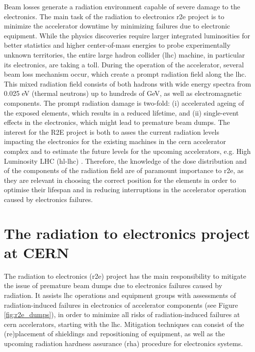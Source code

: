\documentclass[encoding=utf8,british]{tumphthesis}
\begin{document}
Beam losses generate a radiation environment capable of severe damage to the electronics. The main task of the radiation to electronics \acrshort{r2e} project is to minimize the accelerator downtime by minimizing failures due to electronic equipment. While the physics discoveries require larger integrated luminosities for better statistics and higher center-of-mass energies to probe experimentally unknown territories, the entire large hadron collider (\acrshort{lhc}) machine, in particular its electronics, are taking a toll. During the operation of the accelerator, several beam loss mechanism occur, which create a prompt radiation field along the \acrshort{lhc}. This mixed radiation field consists of both hadrons with wide energy spectra from 0.025 eV (thermal neutrons) up to hundreds of GeV, as well as  electromagnetic components. The prompt radiation damage is two-fold: (i) accelerated ageing of the exposed elements, which results in a reduced lifetime, and (ii) single-event effects in the electronics, which might lead to premature beam dumps. The interest for the R2E project is both to asses the current radiation levels impacting the electronics for the existing machines in the \acrshort{cern} accelerator complex and to estimate the future levels for the upcoming accelerators, e.g. High Luminosity LHC (\acrshort{hl-lhc}) \cite{GarcíaAlía:2310128}. Therefore, the knowledge of the dose distribution and of the components of the radiation field are of paramount importance to \acrshort{r2e}, as they are relevant in choosing the correct position for the elements in order to optimise their lifespan \cite{Kacper-Stein-paper} and in reducing interruptions in the accelerator operation caused by electronics failures.

\section{The radiation to electronics project at CERN}

The radiation to electronics (\acrshort{r2e}) project has the main responsibility to mitigate the issue of premature beam dumps due to electronics failures caused by radiation. It assists \acrshort{lhc} operations and equipment groups with assessments of radiation-induced failures in electronics of accelerator components (see Figure \ref{fig:r2e_dumps}), in order to minimize all risks of radiation-induced failures at \acrshort{cern} accelerators, starting with the \acrshort{lhc}. Mitigation techniques can consist of the (re)placement of shieldings and repositioning of equipment, as well as the upcoming radiation hardness assurance (\acrshort{rha}) procedure for electronics systems.
\end{document}
